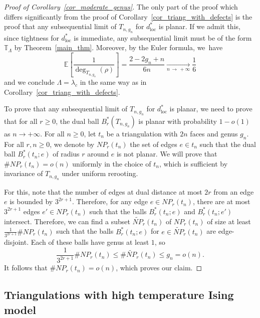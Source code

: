 \documentclass[AHL,Unicode,longabstracts,published]{cedram}
\newcommand{\loc}{\mathrm{loc}}
\newcommand{\TT}{\mathbb{T}}
\newcommand{\E}{\mathbb{E}}
\begin{document}
\begin{proof}[Proof of Corollary~\ref{cor_moderate_genus}]
The only part of the proof which differs significantly from the proof of Corollary~\ref{cor_triang_with_defects} is the proof that any subsequential limit of $T_{n,g_n}$ for $d_{\loc}^*$ is planar. If we admit this, since tightness for $d_{\loc}^*$ is immediate, any subsequential limit must be of the form $\TT_{\Lambda}$ by Theorem~\ref{main_thm}. Moreover, by the Euler formula, we~have
\[
\E\left[\frac{1}{\deg_{T_{n,g_n}}(\rho)} \right] = \frac{2-2g_n+n}{6n} \xrightarrow[n\,\to\,+\infty]{} \frac{1}{6}
\]
and we conclude $\Lambda=\lambda_c$ in the same way as in Corollary~\ref{cor_triang_with_defects}.

To prove that any subsequential limit of $T_{n,g_n}$ for $d^*_{\loc}$ is planar, we need to prove that for all $r \geq 0$, the dual ball $B_r^*(T_{n,g_n})$ is planar with probability $1-o(1)$ as $n \to +\infty$. For all $n \geq 0$, let $t_n$ be a triangulation with $2n$ faces and genus $g_n$. For all $r,n \geq 0$, we denote by $NP_r(t_n)$ the set of edges $e \in t_n$ such that the dual ball $B_r^*(t_n;e)$ of radius $r$ around $e$ is not planar. We will prove that $\# NP_r(t_n)=o(n)$ uniformly in the choice of $t_n$, which is sufficient by invariance of $T_{n,g_n}$ under uniform rerooting.

For this, note that the number of edges at dual distance at most $2r$ from an edge $e$ is bounded by $3^{2r+1}$. Therefore, for any edge $e \in NP_r(t_n)$, there are at most $3^{2r+1}$ edges $e' \in NP_r(t_n)$ such that the balls $B_r^*(t_n;e)$ and $B_r^*(t_n;e')$ intersect. Therefore, we can find a subset $\widetilde{NP}_r(t_n)$ of $NP_r(t_n)$ of size at least $\frac{1}{3^{2r+1}} \# NP_r(t_n)$ such that the balls $B_r^*(t_n ; e)$ for $e \in \widetilde{NP}_r(t_n)$ are edge-disjoint. Each of these balls have genus at least $1$, so
\[
\frac{1}{3^{2r+1}} \# NP_r(t_n) \leq \# \widetilde{NP}_r(t_n) \leq g_n=o(n).
\]
It follows that $\# NP_r(t_n)=o(n)$, which proves our claim.
\end{proof}

\subsection{Triangulations with high temperature Ising model}
\end{document}
